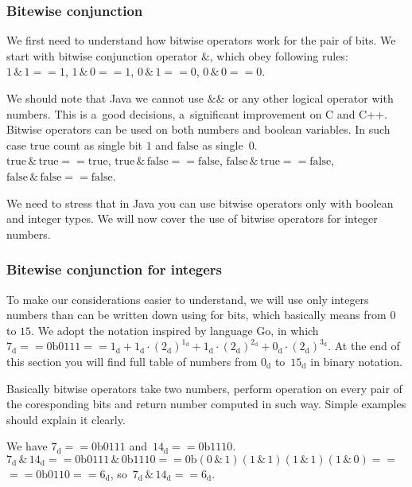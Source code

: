 \documentclass[10pt,t]{beamer}
\begin{document}
\begin{frame}
  \frametitle{Bitewise conjunction}


  We first need to understand how bitwise operators work for the pair of
  bits. We start with bitwise conjunction operator $\&$, which obey
  following rules: \\
  $1 \, \& \, 1 == 1$, $1 \, \& \, 0 == 1$, $0 \, \& \, 1 == 0$,
  $0 \, \& \, 0 == 0$.

  We should note that Java we \alert{cannot} use $\&\&$ or any other logical
  operator with numbers. This is a~good decisions, a~significant improvement
  on C and C++. Bitwise operators can be used on \alert{both} numbers
  and boolean variables. In such case $\text{true}$ count as single bit
  $1$ and $\text{false}$ as single~$0$. \\
  $\text{true} \, \& \, \text{true} == \text{true}$,
  $\text{true} \, \& \, \text{false} == \text{false}$,
  $\text{false} \, \& \, \text{true} == \text{false}$,
  $\text{false} \, \& \, \text{false} == \text{false}$.

  We need to stress that in Java you can use bitwise operators only with
  boolean and integer types. We will now cover the use of bitwise operators
  for integer numbers.

\end{frame}





\begin{frame}
  \frametitle{Bitewise conjunction for integers}


  To make our considerations easier to understand, we will use only integers
  numbers than can be written down using for bits, which basically means
  from $0$ to $15$. We adopt the notation inspired by language Go, in which
  $7_{ \text{d} } == 0\text{b}0111 == 1_{ \text{d} } + 1_{ \text{d} } \cdot
  ( 2_{ \text{d} } )^{ 1_{ \text{d} } } + 1_{ \text{d} } \cdot
  ( 2_{ \text{d} } )^{ 2_{ \text{d} } } + 0_{ \text{d} } \cdot
  ( 2_{ \text{d} } )^{ 3_{ \text{d} } }$. At the end of this section you
  will find full table of numbers from $0_{ \text{d} }$ to~$15_{ \text{d} }$
  in binary notation.

  Basically bitwise operators take two numbers, perform operation on every
  pair of the coresponding bits and return number computed in such way.
  Simple examples should explain it clearly.

  We have $7_{ \text{d} } == 0\text{b}0111$
  and~$14_{ \text{d} } == 0\text{b}1110$. \\
  $7_{ \text{d} } \, \& \, 14_{ \text{d} } == 0\text{b}0111 \, \& \,
  0\text{b}1110 ==
  0\text{b}( 0 \, \& \, 1 )( 1 \, \& \, 1 )( 1 \, \& \, 1 )
  ( 1 \, \& \, 0 ) ==$ \\
  $== 0\text{b}0110 == 6_{ \text{d} }$,
  so~$7_{ \text{d} } \, \& \, 14_{ \text{d} } == 6_{ \text{d} }$.

\end{frame}
\end{document}
